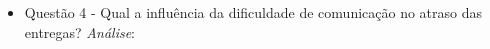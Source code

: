 \begin{apendicesenv}
\begin{itemize}
	  \item Questão 4 - Qual a influência da dificuldade de comunicação no atraso das entregas?
	    \subitem \textit{Análise}:
	  \\
	  \\
	  
	\end{itemize}



	
	
\end{apendicesenv}
